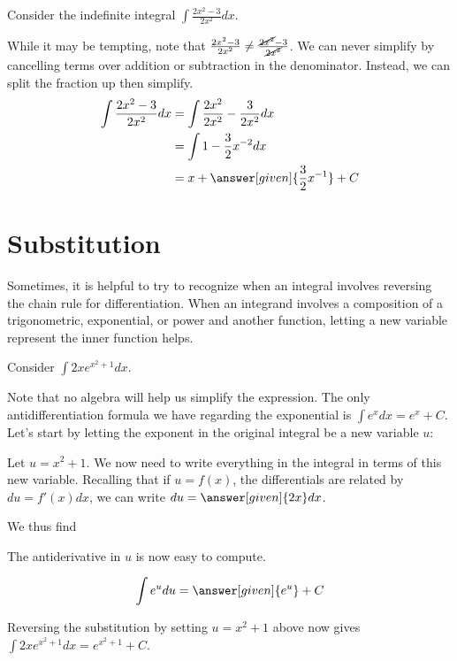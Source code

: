 \documentclass[nooutcomes]{ximera}
\begin{document}
 
\begin{example}
Consider the indefinite integral $\int \frac{2x^2-3}{2x^2} dx$.  

While it may be tempting, note that $\frac{2x^2-3}{2x^2} \neq \frac{\cancel{2x^2}-3}{\cancel{2x^2}}$.  We can never simplify by cancelling terms over addition or subtraction in the denominator.  Instead, we can split the fraction up then simplify.
\begin{align*}
\int \frac{2x^2-3}{2x^2} dx &=\int \frac{2x^2}{2x^2}-\frac{3}{2x^2} dx \\
&=  \int 1-\frac{3}{2}x^{-2} dx \\
&= x+ \answer[given]{\frac{3}{2}x^{-1}}+C
\end{align*}

\end{example}

  
\section{Substitution}

Sometimes, it is helpful to try to recognize when an integral involves reversing the chain rule for differentiation. When an integrand involves a composition of a trigonometric, exponential, or power and another function, letting a new variable represent the inner function helps.

\begin{example}
Consider $\int 2x e^{x^2+1} dx$.  

Note that no algebra will help us simplify the expression.  The only antidifferentiation formula we have regarding the exponential is $\int e^x dx = e^x +C$.  Let's start by letting the exponent in the original integral be a new variable $u$:

Let $u= x^2+1$.  We now need to write everything in the integral in terms of this new variable.  Recalling that if $u = f(x)$, the differentials are related by $du = f'(x) dx$, we can write $du = \answer[given]{2x} dx$.

We thus find

\begin{image}
  \end{image}




The antiderivative in $u$ is now easy to compute.  

\[ \int e^u du = \answer[given]{e^u}+C \]

Reversing the substitution by setting $u=x^2+1$ above  now gives $\int 2xe^{x^2+1} dx = e^{x^2+1}+C$.

\end{example}
\end{document}
